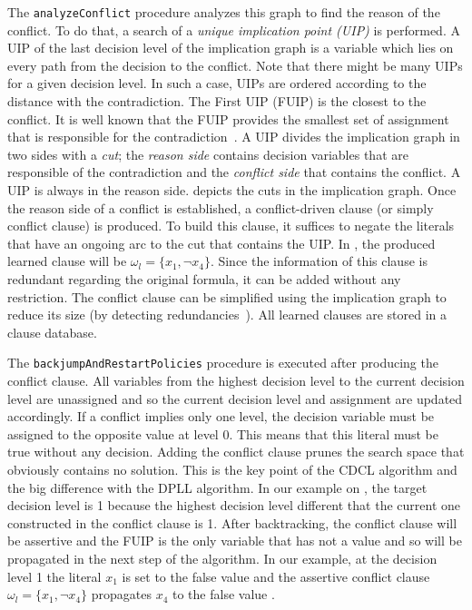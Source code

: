 The \texttt{analyzeConflict} procedure analyzes this graph to find the reason of the conflict. To do that, a search of a
\emph{unique implication point (UIP)} is performed. A UIP of the last decision level of the implication graph is a variable
which lies on every path from the decision to the conflict. Note that there might be many UIPs for a given decision level.
In such a case, UIPs are ordered according to the distance with the contradiction. The First UIP (FUIP) is the closest to
the conflict. It is well known that the FUIP provides the smallest set of assignment that is responsible for the
contradiction~\cite{zhang2001efficient}.
A UIP divides the implication graph in two sides with a \emph{cut}; the \emph{reason side} contains decision variables 
that are responsible of the contradiction and the \emph{conflict side} that contains the conflict. 
 A UIP is always in the reason side.  depicts the cuts in the implication graph.
Once the reason side of a conflict is established, a conflict-driven clause (or simply conflict clause) is produced.
To build this clause, it suffices to negate the
literals that have an ongoing arc to the  cut that contains the UIP. In , the produced
learned clause will be $\omega_l = \{x_1, \neg x_4 \}$. Since the information of this clause is redundant regarding 
the original formula, it can be added without any  restriction. The conflict clause can be simplified
using the implication graph to reduce its size (by detecting redundancies~\cite{sorensson2009minimizing}).
 All learned clauses are stored in a clause database.
 
The \texttt{backjumpAndRestartPolicies} procedure is executed after producing the conflict clause.
All variables from the highest decision level to the current decision level are unassigned and so 
the current decision level and assignment are updated accordingly.
If a conflict implies only one level, the decision variable must be assigned 
to the opposite value at level 0. This means that this literal must be true without any decision.
Adding the conflict clause prunes the search space that obviously contains no solution.
This is the key point of the CDCL algorithm and the big difference with the DPLL algorithm.
 In our example on , the target decision level is 1 because the 
 highest decision level different that the current one constructed in the conflict clause is 1.
After backtracking, the conflict clause will be assertive and the FUIP is the only variable that has
not a value and so will be propagated in the next step of the algorithm. In our example, at the decision level 1 the
literal $x_1$ is set to the false value and the assertive conflict clause $\omega_l = \{x_1, \neg x_4 \}$ propagates $x_4$ to 
the false value .

